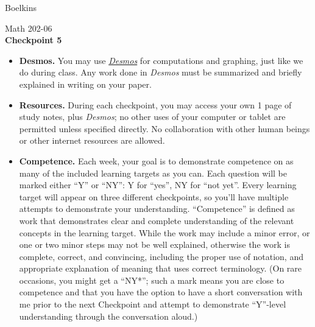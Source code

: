\documentclass[11 pt]{article}
\begin{document}
 \hfill Boelkins \\
 
\begin{center}
Math 202-06 \\
{\bf Checkpoint 5}
\end{center}



\begin{itemize}
	
	\item {\bf Desmos.} You may use \href{https://www.desmos.com/calculator}{\emph{Desmos}} for computations and graphing, just like we do during class.  Any work done in \emph{Desmos} must be summarized and briefly explained in writing on your paper.  
	
	\item {\bf Resources.} During each checkpoint, you may access your own 1 page of study notes, plus \emph{Desmos}; no other uses of your computer or tablet are permitted unless specified directly.  No collaboration with other human beings or other internet resources are allowed.
	
	
	\item {\bf Competence.} Each week, your goal is to demonstrate competence on as many of the included learning targets as you can.  Each question will be marked either ``Y'' or ``NY'': Y for ``yes'', NY for ``not yet''.  Every learning target will appear on three different checkpoints, so you'll have multiple attempts to demonstrate your understanding.  ``Competence'' is defined as work that demonstrates clear and complete understanding of the relevant concepts in the learning target. While the work may include a minor error, or one or two minor steps may not be well explained, otherwise the work is complete, correct, and convincing, including the proper use of notation, and appropriate explanation of meaning that uses correct terminology.  (On rare occasions, you might get a ``NY*''; such a mark means you are close to competence and that you have the option to have a short conversation with me prior to the next Checkpoint and attempt to demonstrate ``Y''-level understanding through the conversation aloud.)	
\end{itemize}

\noindent \hrulefill \\
\end{document}
